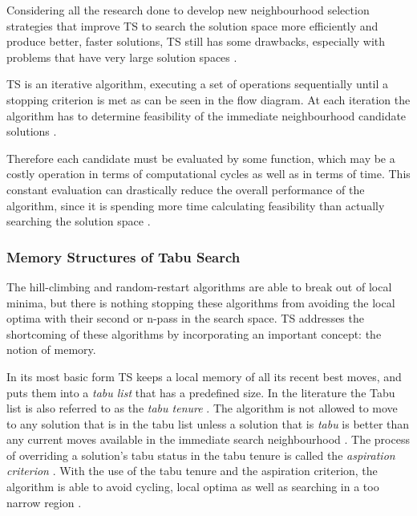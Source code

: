 Considering all the research done to develop new neighbourhood selection strategies that improve TS to search the solution space more efficiently and produce better, faster solutions, TS still has some drawbacks, especially with problems that have very large solution spaces \cite{EvoParallelTabu}.

TS is an iterative algorithm, executing a set of operations sequentially until a stopping criterion is met as can be seen in the flow diagram. At each iteration the algorithm has to determine feasibility of the immediate neighbourhood candidate solutions \cite{EvoParallelTabu,TabuVechicleRoutingWithTimeWindows}. 

Therefore each candidate must be evaluated by some function, which may be a costly operation in terms of computational cycles as well as in terms of time. This constant evaluation can drastically reduce the overall performance of the algorithm, since it is spending more time calculating feasibility than actually searching the solution space \cite{EvoParallelTabu,TabuVechicleRoutingWithTimeWindows}.

\subsubsection{Memory Structures of Tabu Search}
The hill-climbing and random-restart algorithms are able to break out of local minima, but there is nothing stopping these algorithms from avoiding the local optima with their second or n-pass in the search space. TS addresses the shortcoming of these algorithms by incorporating an important concept: the notion of memory.

In its most basic form TS keeps a local memory of all its recent best moves, and puts them into a \emph{tabu list} that has a predefined size. In the literature the Tabu list is also referred to as the \emph{tabu tenure} \cite{TSHazardous,TabuCarryOver,ReactiveTabuVHR,TabuParameterization}. The algorithm is not allowed to move to any solution that is in the tabu list unless a solution that is \emph{tabu} is better than any current moves available in the immediate search neighbourhood \cite{TSHazardous,TabuCarryOver,ReactiveTabuVHR,TabuParameterization}. The process of overriding a solution's tabu status in the tabu tenure is called the \emph{aspiration criterion} \cite{TSHazardous,TabuCarryOver,ReactiveTabuVHR,TabuParameterization}. With the use of the tabu tenure and the aspiration criterion, the algorithm is able to avoid cycling, local optima as well as searching in a too narrow region \cite{TabuSingleMachineScheduling,CircuitTabu}.


